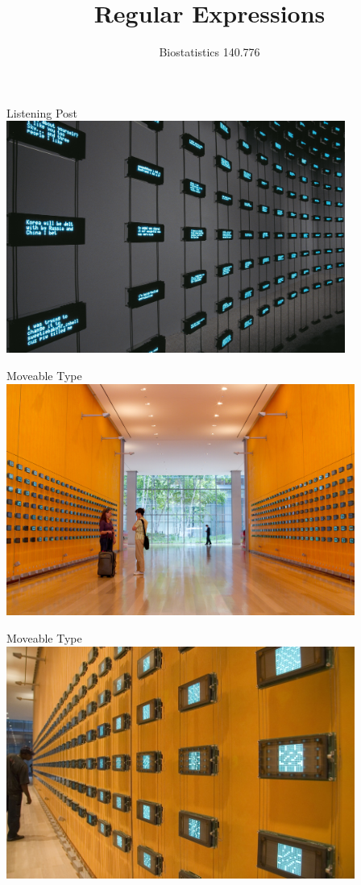 \documentclass{beamer}
\title{Regular Expressions}
\date{Biostatistics 140.776}
\begin{document}
\begin{frame}
  \titlepage
\end{frame}

\begin{frame}{Listening Post}
\includegraphics[height=3in]{listeningpost}
\end{frame}

\begin{frame}{Moveable Type}
\includegraphics[height=3in]{MT1}
\end{frame}

\begin{frame}{Moveable Type}
\includegraphics[height=3in]{MT2}
\end{frame}
\end{document}
